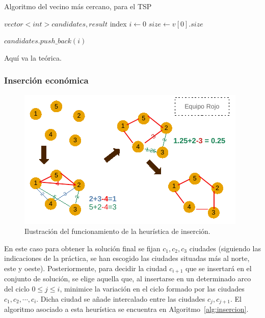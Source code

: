\begin{algorithm}
    \caption{Algoritmo del vecino más cercano, para el TSP}\label{alg:vec_cercano}
    $vector<int> candidates,result$\;
    index\;
    $i \gets 0$\;
    $size \gets v[0].size$\;

    $candidates.push\_back(i)$\;

\end{algorithm}


Aquí va la teórica.


\subsubsection{Inserción económica}

\begin{figure}[H] 
  \centering
  \includegraphics[scale=1.5]{img/DibInsercion.pdf}
  \caption{Ilustración del funcionamiento de la heurística de inserción.}
  \label{fig:inser}
\end{figure}

En este caso para obtener la solución final se fijan $c_1,c_2,c_3$ ciudades
(siguiendo las indicaciones de la práctica, se han
escogido las ciudades situadas más al norte, este y oeste). 
Posteriormente,
para decidir la ciudad $c_{i+1}$ que se insertará en el conjunto de solución,
se elige aquella que, al insertarse en un determinado arco del ciclo 
$0 \leq j \leq i$, minimice la variación en el ciclo formado por las ciudades
$c_1,c_2,\cdots,c_{i}$. Dicha ciudad se añade intercalado entre las ciudades
$c_{j},c_{j+1}$. El algoritmo asociado a esta heurística se encuentra en 
Algoritmo~\ref{alg:insercion}. 

